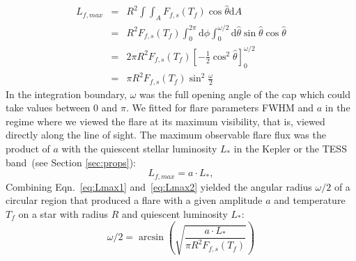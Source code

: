\documentclass[fleqn,usenatbib,letters]{mnras}%
\begin{document}
\begin{eqnarray}
    L_{f,max}&=&R^2  \displaystyle\int\int_A F_{f,s}(T_f) \cos\hat\theta \mathrm {d}A\\
    &=& R^2 F_{f,s}(T_f) \displaystyle\int_{0}^{2\pi}\mathrm{d}\phi\int_{0}^{\omega/2}\mathrm{d}\hat\theta \sin\hat\theta\cos\hat\theta\\
    &=& 2\pi R^2 F_{f,s}(T_f)\left[-\tfrac{1}{2} \cos^2\hat\theta\right]^{\omega/2}_0 \\
    &=& \pi R^2 F_{f,s}(T_f) \sin^2\tfrac{\omega}{2}
    \label{eq:Lmax1}
\end{eqnarray}
In the integration boundary, $\omega$ was the full opening angle of the cap which could take values between 0 and $\pi$. We fitted for flare parameters FWHM and $a$ in the regime where we viewed the flare at its maximum visibility, that is, viewed directly along the line of sight. The maximum observable flare flux was the product of $a$ with the quiescent stellar luminosity $L_{*}$ in the Kepler or the TESS band~(see Section \ref{sec:props}):
\begin{equation}
L_{f,max} = a \cdot L_{*},
\label{eq:Lmax2}
\end{equation}
Combining Eqn.~\ref{eq:Lmax1} and~\ref{eq:Lmax2} yielded the angular radius $\omega/2$ of a circular region that produced a flare with a given amplitude $a$ and temperature $T_f$ on a star with radius $R$ and quiescent luminosity $L_{*}$:
\begin{equation}
\omega/2 = \arcsin\left(\sqrt{\dfrac{a \cdot L_{*}}{\pi R^2 F_{f,s}(T_f)}}\right)
\end{equation}
\end{document}
